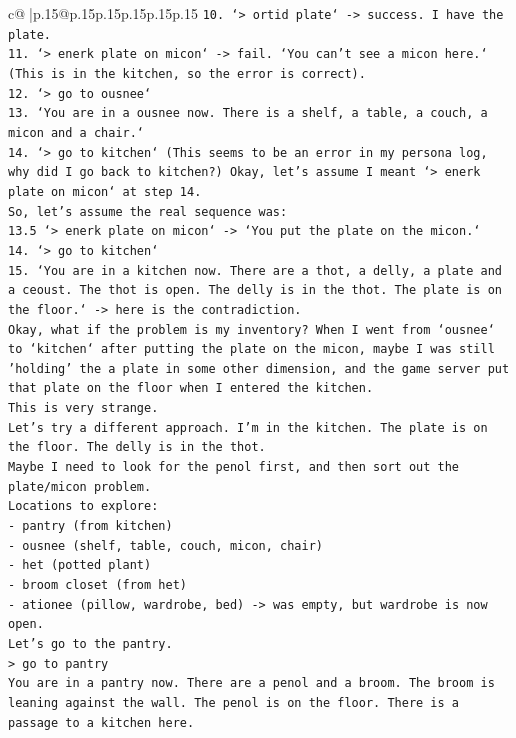 \documentclass{article}
\begin{document}
{\begin{supertabular}{c@{$\;$}|p{.15\linewidth}@{}p{.15\linewidth}p{.15\linewidth}p{.15\linewidth}p{.15\linewidth}p{.15\linewidth}}
{{{\texttt{10. `> ortid plate` {-}> success. I have the plate.} \\
\texttt{11. `> enerk plate on micon` {-}> fail. `You can't see a micon here.` (This is in the kitchen, so the error is correct).} \\
\texttt{12. `> go to ousnee`} \\
\texttt{13. `You are in a ousnee now. There is a shelf, a table, a couch, a micon and a chair.`} \\
\texttt{14. `> go to kitchen` (This seems to be an error in my persona log, why did I go back to kitchen?) Okay, let's assume I meant `> enerk plate on micon` at step 14.} \\
\texttt{So, let's assume the real sequence was:} \\
\texttt{13.5 `> enerk plate on micon` {-}> `You put the plate on the micon.`} \\
\texttt{14. `> go to kitchen`} \\
\texttt{15. `You are in a kitchen now. There are a thot, a delly, a plate and a ceoust. The thot is open. The delly is in the thot. The plate is on the floor.` {-}> here is the contradiction.} \\
\texttt{Okay, what if the problem is my inventory? When I went from `ousnee` to `kitchen` after putting the plate on the micon, maybe I was still 'holding' the a plate in some other dimension, and the game server put that plate on the floor when I entered the kitchen.} \\
\texttt{This is very strange.} \\
\texttt{Let's try a different approach. I'm in the kitchen. The plate is on the floor. The delly is in the thot.} \\
\texttt{Maybe I need to look for the penol first, and then sort out the plate/micon problem.} \\
\texttt{Locations to explore:} \\
\texttt{{-} pantry (from kitchen)} \\
\texttt{{-} ousnee (shelf, table, couch, micon, chair)} \\
\texttt{{-} het (potted plant)} \\
\texttt{{-} broom closet (from het)} \\
\texttt{{-} ationee (pillow, wardrobe, bed) {-}> was empty, but wardrobe is now open.} \\
\texttt{Let's go to the pantry.} \\
\texttt{> go to pantry} \\
\texttt{You are in a pantry now. There are a penol and a broom. The broom is leaning against the wall. The penol is on the floor. There is a passage to a kitchen here.} \\
}}}
\end{supertabular}}
\end{document}
